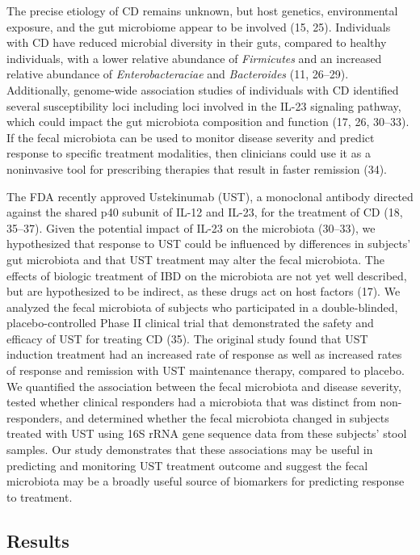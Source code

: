 \documentclass[12pt,]{article}
\begin{document}
The precise etiology of CD remains unknown, but host genetics,
environmental exposure, and the gut microbiome appear to be involved
(15, 25). Individuals with CD have reduced microbial diversity in their
guts, compared to healthy individuals, with a lower relative abundance
of \emph{Firmicutes} and an increased relative abundance of
\emph{Enterobacteraciae} and \emph{Bacteroides} (11, 26--29).
Additionally, genome-wide association studies of individuals with CD
identified several susceptibility loci including loci involved in the
IL-23 signaling pathway, which could impact the gut microbiota
composition and function (17, 26, 30--33). If the fecal microbiota can
be used to monitor disease severity and predict response to specific
treatment modalities, then clinicians could use it as a noninvasive tool
for prescribing therapies that result in faster remission (34).

The FDA recently approved Ustekinumab (UST), a monoclonal antibody
directed against the shared p40 subunit of IL-12 and IL-23, for the
treatment of CD (18, 35--37). Given the potential impact of IL-23 on the
microbiota (30--33), we hypothesized that response to UST could be
influenced by differences in subjects' gut microbiota and that UST
treatment may alter the fecal microbiota. The effects of biologic
treatment of IBD on the microbiota are not yet well described, but are
hypothesized to be indirect, as these drugs act on host factors (17). We
analyzed the fecal microbiota of subjects who participated in a
double-blinded, placebo-controlled Phase II clinical trial that
demonstrated the safety and efficacy of UST for treating CD (35). The
original study found that UST induction treatment had an increased rate
of response as well as increased rates of response and remission with
UST maintenance therapy, compared to placebo. We quantified the
association between the fecal microbiota and disease severity, tested
whether clinical responders had a microbiota that was distinct from
non-responders, and determined whether the fecal microbiota changed in
subjects treated with UST using 16S rRNA gene sequence data from these
subjects' stool samples. Our study demonstrates that these associations
may be useful in predicting and monitoring UST treatment outcome and
suggest the fecal microbiota may be a broadly useful source of
biomarkers for predicting response to treatment.

\subsection{Results}\label{results}
\end{document}
